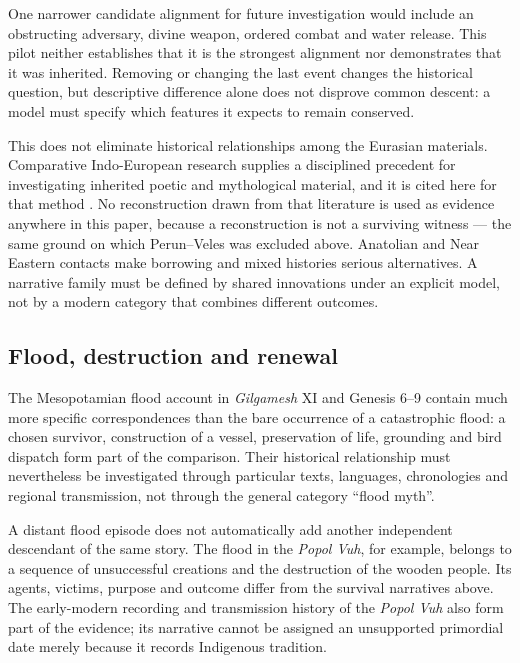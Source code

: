 \documentclass[11pt]{article}
\DeclareRobustCommand{\_}{\textunderscore\allowbreak}
\begin{document}
One narrower candidate alignment for future investigation would include an
obstructing adversary, divine weapon, ordered combat and water release. This
pilot neither establishes that it is the strongest alignment nor demonstrates
that it was inherited. Removing or changing the last event changes the historical
question, but descriptive difference alone does not disprove common descent: a
model must specify which features it expects to remain conserved.

This does not eliminate historical relationships among the Eurasian materials.
Comparative Indo-European research supplies a disciplined precedent for investigating
inherited poetic and mythological material, and it is cited here for that method
\citep{watkins1995,west2007}. No reconstruction drawn from that literature is used as
evidence anywhere in this paper, because a reconstruction is not a surviving witness ---
the same ground on which Perun--Veles was excluded above.
Anatolian and Near Eastern contacts make borrowing and mixed histories serious
alternatives. A narrative family must be defined by shared innovations under an
explicit model, not by a modern category that combines different outcomes.

\subsection{Flood, destruction and renewal}

The Mesopotamian flood account in \emph{Gilgamesh} XI \citep{george2003} and Genesis 6--9 contain
much more specific correspondences than the bare occurrence of a catastrophic
flood: a chosen survivor, construction of a vessel, preservation of life,
grounding and bird dispatch form part of the comparison. Their historical
relationship must nevertheless be investigated through particular texts,
languages, chronologies and regional transmission, not through the general
category ``flood myth''.

A distant flood episode does not automatically add another independent descendant
of the same story. The flood in the \emph{Popol Vuh}, for example, belongs to a
sequence of unsuccessful creations and the destruction of the wooden people. Its
agents, victims, purpose and outcome differ from the survival narratives above.
The early-modern recording and transmission history of the \emph{Popol Vuh} also
form part of the evidence; its narrative cannot be assigned an unsupported
primordial date merely because it records Indigenous tradition.
\end{document}
